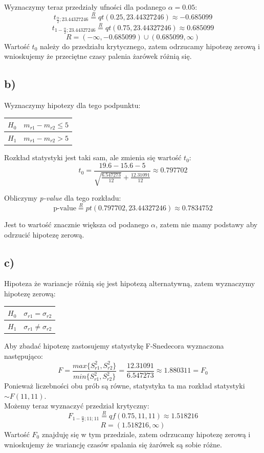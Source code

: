 \documentclass{article}
\begin{document}
Wyznaczymy teraz przedziały ufności dla podanego $\alpha = 0.05$:
\[ t_{\frac{\alpha}{2};23.44327246} \overset{R}{=} qt(0.25, 23.44327246) \approx -0.685099 \]
\[ t_{1 - \frac{\alpha}{2}; 23.44327246} \overset{R}{=} qt(0.75, 23.44327246) \approx 0.685099 \]
\[ R = ( -\infty, -0.685099 ) \cup (0.685099, \infty) \]
Wartość $t_0$ należy do przedziału krytycznego, zatem odrzucamy hipotezę zerową i wnioskujemy że przeciętne czasy palenia żarówek różnią się.

\subsection{b)}
Wyznaczymy hipotezy dla tego podpunktu:
\begin{center} \begin{tabular}{|c|c|} \hline
$H_0$ & $m_{r1} - m_{r2} \leq 5$ \\ \hline
$H_1$ & $m_{r1} - m_{r2} > 5$ \\ \hline
\end{tabular} \end{center}

Rozkład statystyki jest taki sam, ale zmienia się wartość $t_0$:
\[ t_0 = \frac{19.6 - 15.6 - 5}{\sqrt{ \frac{6.547273}{12}} + \frac{12.31091}{12}} \approx 0.797702 \]

Obliczymy \textit{p-value} dla tego rozkładu:
\[ \text{p-value} \overset{R}{=} pt(0.797702, 23.44327246) \approx 0.7834752 \]

Jest to wartość znacznie większa od podanego $\alpha$, zatem nie mamy podstawy aby odrzucić hipotezę zerową.

\subsection{c)}
Hipoteza że wariancje różnią się jest hipotezą alternatywną, zatem wyznaczymy hipotezę zerową:
\begin{center} \begin{tabular}{|c|c|} \hline
$H_0$ & $\sigma_{r1} = \sigma_{r2}$ \\ \hline
$H_1$ & $\sigma_{r1} \neq \sigma_{r2}$ \\ \hline
\end{tabular} \end{center}

Aby zbadać hipotezę zastosujemy statystykę F-Snedecora wyznaczona następująco:
\[ F = \frac{max\{S_{r1}^2, S_{r2}^2\}}{min\{S_{r1}^2, S_{r2}^2\}} = \frac{12.31091}{6.547273} \approx 1.880311 = F_0 \]
Ponieważ liczebności obu prób są równe, statystyka ta ma rozkład statystyki $\sim F(11,11)$. \\
Możemy teraz wyznaczyć przedział krytyczny:
\[ F_{1-\frac{\alpha}{2};11;11} \overset{R}{=} qf(0.75, 11, 11) \approx 1.518216 \]
\[ R = (1.518216, \infty) \]
Wartość $F_0$ znajduję się w tym przedziale, zatem odrzucamy hipotezę zerową i wnioskujemy że wariancję czasów spalania się żarówek są sobie różne.
\end{document}
